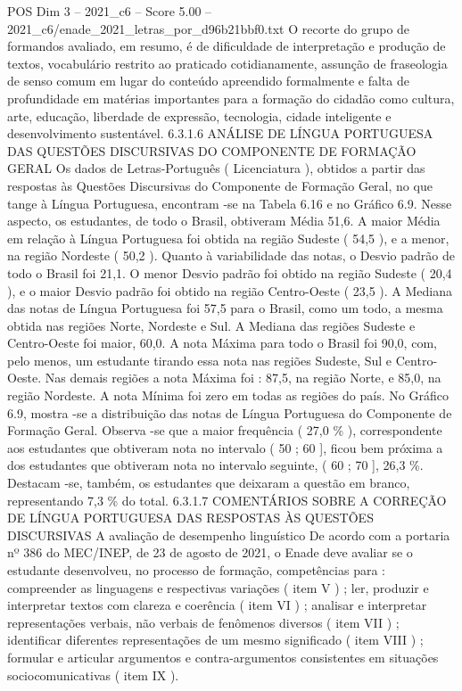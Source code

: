 \begin{textsample}{POS Dim 3 – 2021\_c6 – Score 5.00 – 2021\_c6/enade\_2021\_letras\_por\_d96b21bbf0.txt}
O recorte do grupo de formandos avaliado, em resumo, é de dificuldade de interpretação e produção de textos, vocabulário restrito ao praticado cotidianamente, assunção de fraseologia de senso comum em lugar do conteúdo apreendido formalmente e falta de profundidade em matérias importantes para a formação do cidadão como cultura, arte, educação, liberdade de expressão, tecnologia, cidade inteligente e desenvolvimento sustentável. 6.3.1.6 ANÁLISE DE LÍNGUA PORTUGUESA DAS QUESTÕES DISCURSIVAS DO COMPONENTE DE FORMAÇÃO GERAL Os dados de Letras-Português ( Licenciatura ), obtidos a partir das respostas às Questões Discursivas do Componente de Formação Geral, no que tange à Língua Portuguesa, encontram -se na Tabela 6.16 e no Gráfico 6.9.
Nesse aspecto, os estudantes, de todo o Brasil, obtiveram Média 51,6.
A maior Média em relação à Língua Portuguesa foi obtida na região Sudeste ( 54,5 ), e a menor, na região Nordeste ( 50,2 ).
Quanto à variabilidade das notas, o Desvio padrão de todo o Brasil foi 21,1.
O menor Desvio padrão foi obtido na região Sudeste ( 20,4 ), e o maior Desvio padrão foi obtido na região Centro-Oeste ( 23,5 ).
A Mediana das notas de Língua Portuguesa foi 57,5 para o Brasil, como um todo, a mesma obtida nas regiões Norte, Nordeste e Sul.
A Mediana das regiões Sudeste e Centro-Oeste foi maior, 60,0.
A nota Máxima para todo o Brasil foi 90,0, com, pelo menos, um estudante tirando essa nota nas regiões Sudeste, Sul e Centro-Oeste.
Nas demais regiões a nota Máxima foi : 87,5, na região Norte, e 85,0, na região Nordeste.
A nota Mínima foi zero em todas as regiões do país.
No Gráfico 6.9, mostra -se a distribuição das notas de Língua Portuguesa do Componente de Formação Geral.
Observa -se que a maior frequência ( 27,0 \% ), correspondente aos estudantes que obtiveram nota no intervalo ( 50 ; 60 ], ficou bem próxima a dos estudantes que obtiveram nota no intervalo seguinte, ( 60 ; 70 ], 26,3 \%.
Destacam -se, também, os estudantes que deixaram a questão em branco, representando 7,3 \% do total. 6.3.1.7 COMENTÁRIOS SOBRE A CORREÇÃO DE LÍNGUA PORTUGUESA DAS RESPOSTAS ÀS QUESTÕES DISCURSIVAS A avaliação de desempenho linguístico De acordo com a portaria nº 386 do MEC/INEP, de 23 de agosto de 2021, o Enade deve avaliar se o estudante desenvolveu, no processo de formação, competências para : compreender as linguagens e respectivas variações ( item V ) ; ler, produzir e interpretar textos com clareza e coerência ( item VI ) ; analisar e interpretar representações verbais, não verbais de fenômenos diversos ( item VII ) ; identificar diferentes representações de um mesmo significado ( item VIII ) ; formular e articular argumentos e contra-argumentos consistentes em situações sociocomunicativas ( item IX ).

\end{textsample}
